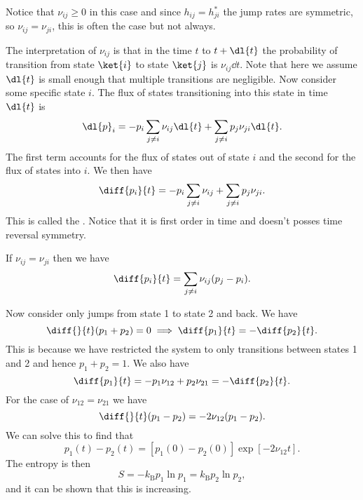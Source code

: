 \documentclass[fleqn]{NotesClass}
\newcommand*{\boltzmann}{k_{\mathrm{B}}}
\begin{document}
    Notice that \(\nu_{ij} \ge 0\) in this case and since \(h_{ij} = h_{ji}^*\) the jump rates are symmetric, so \(\nu_{ij} = \nu_{ji}\), this is often the case but not always.
    
    The interpretation of \(\nu_{ij}\) is that in the time \(t\) to \(t + \dl{t}\) the probability of transition from state \(\ket{i}\) to state \(\ket{j}\) is \(\nu_{ij}\dd{t}\).
    Note that here we assume \(\dl{t}\) is small enough that multiple transitions are negligible.
    Now consider some specific state \(i\).
    The flux of states transitioning into this state in time \(\dl{t}\) is
    \begin{equation}
        \dl{p}_i = -p_i\sum_{j\ne i} \nu_{ij}\dl{t} + \sum_{j\ne i} p_j\nu_{ji}\dl{t}.
    \end{equation}
    The first term accounts for the flux of states out of state \(i\) and the second for the flux of states into \(i\).
    We then have
    \begin{equation}
        \diff{p_i}{t} = -p_i\sum_{j \ne i} \nu_{ij} + \sum_{j\ne i} p_j\nu_{ji}.
    \end{equation}
    This is called the .
    Notice that it is first order in time and doesn't posses time reversal symmetry.
    
    If \(\nu_{ij} = \nu_{ji}\) then we have
    \begin{equation}
        \diff{p_i}{t} = \sum_{j\ne i} \nu_{ij}(p_j - p_i).
    \end{equation}
    
    Now consider only jumps from state 1 to state 2 and back.
    We have
    \begin{equation}
        \diff{}{t}(p_1 + p_2) = 0 \implies \diff{p_1}{t} = -\diff{p_2}{t}.
    \end{equation}
    This is because we have restricted the system to only transitions between states 1 and 2 and hence \(p_1 + p_2 = 1\).
    We also have
    \begin{equation}
        \diff{p_1}{t} = -p_1\nu_{12} + p_2\nu_{21} = -\diff{p_2}{t}.
    \end{equation}
    For the case of \(\nu_{12} = \nu_{21}\) we have
    \begin{equation}
        \diff{}{t}(p_1 - p_2) = -2\nu_{12}(p_1 - p_2).
    \end{equation}
    We can solve this to find that
    \begin{equation}
        p_1(t) - p_2(t) = [p_1(0) - p_2(0)]\exp[-2\nu_{12}t].
    \end{equation}
    The entropy is then
    \begin{equation}
        S = -\boltzmann p_1\ln p_1 = \boltzmann p_2\ln p_2,
    \end{equation}
    and it can be shown that this is increasing.
    
\end{document}
